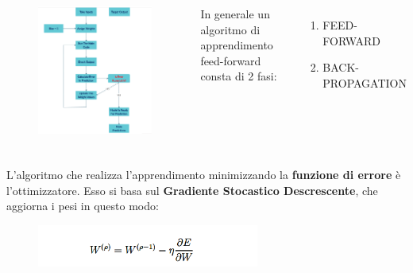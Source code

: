 \documentclass{beamer}
\begin{document}
\begin{frame}
	\frametitle{ }
	
	\begin{columns}
		\begin{figure}
			\includegraphics[width=\textwidth]{ann-flow-chart.png}
		\end{figure}
		In generale un algoritmo di apprendimento feed-forward consta di 2 fasi: 
\begin{enumerate}
   \item FEED-FORWARD 
   \item BACK-PROPAGATION
\end{enumerate} 
	\end{columns}

	
\end{frame}

\begin{frame}
	\frametitle{}
	L'algoritmo che realizza l'apprendimento minimizzando la \textbf{funzione di errore} è l'ottimizzatore.
	Esso si basa sul \textbf{Gradiente Stocastico Descrescente}, che aggiorna i pesi in questo modo: 
	\medskip
	\begin{figure}
		\includegraphics[width=0.65\textwidth]{aggpesi.PNG}
		
	\end{figure}
	
	
\end{frame}
\end{document}
